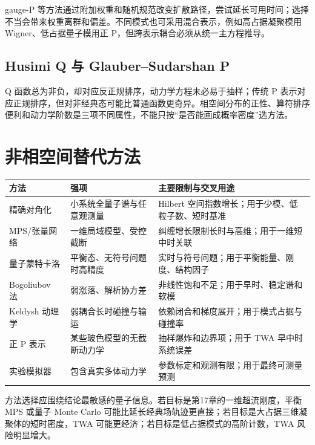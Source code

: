 gauge-P 等方法通过附加权重和随机规范改变扩散路径，尝试延长可用时间；选择不当会带来权重离群和偏差。不同模式也可采用混合表示，例如高占据凝聚模用 Wigner、低占据量子模用正 P，但跨表示耦合必须从统一主方程推导。

\subsection{Husimi Q 与 Glauber--Sudarshan P}

Q 函数总为非负，却对应反正规排序，动力学方程未必易于抽样；传统 P 表示对应正规排序，但对非经典态可能比普通函数更奇异。相空间分布的正性、算符排序便利和动力学阶数是三项不同属性，不能只按“是否能画成概率密度”选方法。

\section{非相空间替代方法}

\begin{center}
\begin{tabularx}{\textwidth}{>{\raggedright\arraybackslash}p{}>{\raggedright\arraybackslash}X>{\raggedright\arraybackslash}X}
\toprule
方法 & 强项 & 主要限制与交叉用途 \\
\midrule
精确对角化 & 小系统全量子谱与任意观测量 & Hilbert 空间指数增长；用于少模、低粒子数、短时基准 \\
MPS/张量网络\cite{Vidal2003} & 一维局域模型、受控截断 & 纠缠增长限制长时与高维；用于一维短中时关联 \\
量子蒙特卡洛 & 平衡态、无符号问题时高精度 & 实时与符号问题；用于平衡能量、刚度、结构因子 \\
Bogoliubov 法 & 弱涨落、解析协方差 & 非线性饱和不足；用于早时、稳定谱和软模 \\
Keldysh 动理学 & 弱耦合长时碰撞与输运 & 依赖闭合和梯度展开；用于模式占据与碰撞率 \\
正 P 表示 & 某些玻色模型的无截断动力学 & 抽样爆炸和边界项；用于 TWA 早中时系统误差 \\
实验模拟器 & 包含真实多体动力学 & 参数标定和观测有限；用于最终可测量预测 \\
\bottomrule
\end{tabularx}
\end{center}

方法选择应围绕结论最敏感的量子信息。若目标是第17章的一维超流刚度，平衡 MPS 或量子 Monte Carlo 可能比延长经典场轨迹更直接；若目标是大占据三维凝聚体的短时密度，TWA 可能更经济；若目标是低占据模式的高阶计数，TWA 风险明显增大。

